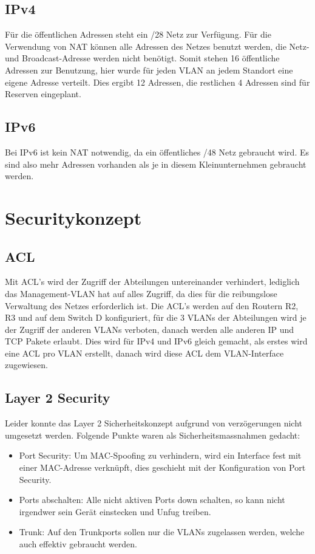 \documentclass[11pt,a4paper]{scrreprt}
\begin{document}
\subsection{IPv4}
Für die öffentlichen Adressen steht ein /28 Netz zur Verfügung. Für die Verwendung von \acs{NAT} können alle Adressen des Netzes benutzt werden, die Netz- und Broadcast-Adresse werden nicht benötigt. Somit stehen 16 öffentliche Adressen zur Benutzung, hier wurde für jeden \acs{VLAN} an jedem Standort eine eigene Adresse verteilt. Dies ergibt 12 Adressen, die restlichen 4 Adressen sind für Reserven eingeplant.

\subsection{IPv6}
Bei IPv6 ist kein \acs{NAT} notwendig, da ein öffentliches /48 Netz gebraucht wird. Es sind also mehr Adressen vorhanden als je in diesem Kleinunternehmen gebraucht werden.

\newpage
\section{Securitykonzept} 
\subsection{ACL} \label{acl}
Mit \acs{ACL}'s wird der Zugriff der Abteilungen untereinander verhindert, lediglich das Management-\acs{VLAN} hat auf alles Zugriff, da dies für die reibungslose Verwaltung des Netzes erforderlich ist.
Die \acs{ACL}'s werden auf den Routern R2, R3 und auf dem Switch D konfiguriert, für die 3 \acs{VLAN}s der Abteilungen wird je der Zugriff der anderen \acs{VLAN}s verboten, danach werden alle anderen IP und TCP Pakete erlaubt. Dies wird für IPv4 und IPv6 gleich gemacht, als erstes wird eine ACL pro \acs{VLAN} erstellt, danach wird diese \acs{ACL} dem \acs{VLAN}-Interface zugewiesen.

\subsection{Layer 2 Security}
Leider konnte das Layer 2 Sicherheitskonzept aufgrund von verzögerungen nicht umgesetzt werden. Folgende Punkte waren als Sicherheitsmassnahmen gedacht: 
\begin{itemize}
\item Port Security: Um MAC-Spoofing zu verhindern, wird ein Interface fest mit einer MAC-Adresse verknüpft, dies geschieht mit der Konfiguration von Port Security.
\item Ports abschalten: Alle nicht aktiven Ports down schalten, so kann nicht irgendwer sein Gerät einstecken und Unfug treiben.
\item Trunk: Auf den Trunkports sollen nur die \acs{VLAN}s zugelassen werden, welche auch effektiv gebraucht werden.
\end{itemize}
\end{document}
